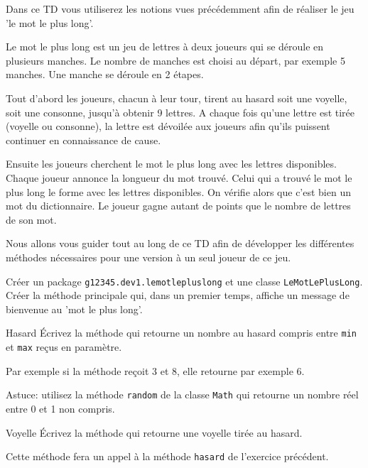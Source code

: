 \documentclass[a4paper,11pt]{article}
\date{2018 -- 2019}
\begin{document}
\entete
\titre
{}
\lastedit

\vspace{0.5cm}

	Dans ce TD vous utiliserez les notions vues précédemment afin de réaliser 
	le jeu 'le mot le plus long'. 
	
	Le mot le plus long est un jeu de lettres à deux joueurs qui se déroule en
	plusieurs manches. Le nombre de manches est choisi au départ, par exemple 5 manches.
	Une manche se déroule en 2 étapes. 
	
	Tout d'abord les joueurs, chacun à leur tour, 
	tirent au hasard soit une voyelle, soit une consonne, 
	jusqu'à obtenir 9 lettres. A chaque fois qu'une lettre est tirée 
	(voyelle ou consonne), la lettre est dévoilée aux joueurs afin qu'ils puissent
	continuer en connaissance de cause.

	Ensuite les joueurs cherchent le mot le plus long avec les lettres disponibles.
	Chaque joueur annonce la longueur du mot trouvé. Celui qui a trouvé le mot le 
	plus long le forme avec les lettres disponibles. On vérifie alors que c'est 
	bien un mot du dictionnaire. Le joueur gagne autant de points que le nombre
	de lettres de son mot. 
			

\vspace{0.5cm}


Nous allons vous guider tout au long de ce TD afin de développer les différentes méthodes nécessaires pour une version à un seul joueur de ce jeu.



		Créer un package \texttt{g12345.dev1.lemotlepluslong} et une classe
		 \texttt{LeMotLePlusLong}. Créer la méthode principale qui, dans un premier 
		temps, affiche un message de bienvenue au 'mot le plus long'.


 	\begin{Exercice}{Hasard}
		\'Ecrivez la méthode  qui
		retourne un nombre au hasard compris entre \texttt{min} et
		\texttt{max} reçus en paramètre.
		
		Par exemple si la méthode reçoit 3 et 8, elle retourne par exemple 6.
		
		Astuce: utilisez la méthode \texttt{random} de la classe \texttt{Math} qui 
		retourne un nombre réel entre 0 et 1 non compris.
	\end{Exercice} 

 
 	\begin{Exercice}{Voyelle}
		\'Ecrivez la méthode  qui retourne une voyelle 
		tirée au hasard.
		
		Cette méthode fera un appel à la méthode \texttt{hasard} 
		de l'exercice précédent.
	\end{Exercice} 
\end{document}
